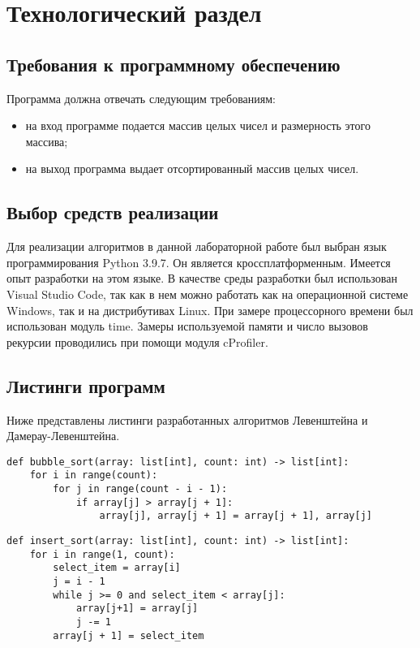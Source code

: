 \chapter{Технологический раздел}
\section{Требования к программному обеспечению}
Программа должна отвечать следующим требованиям:
\begin{itemize}
	\item на вход программе подается массив целых чисел и размерность этого массива;
	\item на выход программа выдает отсортированный массив целых чисел.
\end{itemize}

\section{Выбор средств реализации}
Для реализации алгоритмов в данной лабораторной работе был выбран язык программирования Python 3.9.7\cite{python3}. Он является кроссплатформенным. Имеется опыт разработки на этом языке. В качестве среды разработки был использован Visual Studio Code\cite{vs}, так как в нем можно работать как на операционной системе Windows, так и на дистрибутивах Linux. При замере процессорного времени был использован модуль time\cite{time}. Замеры используемой памяти и число вызовов рекурсии проводились при помощи модуля cProfiler\cite{cprofile}.
\section{Листинги программ}
Ниже представлены листинги разработанных алгоритмов Левенштейна и Дамерау-Левенштейна.

\begin{lstlisting}[label=some-code,caption=Программный код сортировки пузырьком]
def bubble_sort(array: list[int], count: int) -> list[int]:
	for i in range(count):
		for j in range(count - i - 1):
			if array[j] > array[j + 1]:
				array[j], array[j + 1] = array[j + 1], array[j]
\end{lstlisting}

\begin{lstlisting}[label=some-code,caption=Программный код сортировки вставками]
def insert_sort(array: list[int], count: int) -> list[int]:
	for i in range(1, count):
		select_item = array[i]
		j = i - 1
		while j >= 0 and select_item < array[j]:
			array[j+1] = array[j]
			j -= 1
		array[j + 1] = select_item
\end{lstlisting}

